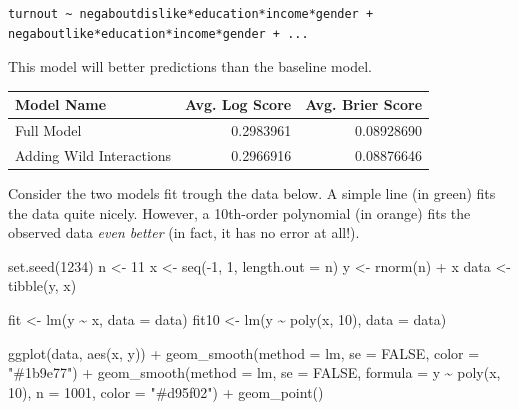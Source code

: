 \documentclass[
]{book}
\newenvironment{Shaded}{\begin{snugshade}}{\end{snugshade}}
\newcommand{\AttributeTok}[1]{\textcolor[rgb]{0.77,0.63,0.00}{#1}}
\newcommand{\ConstantTok}[1]{\textcolor[rgb]{0.00,0.00,0.00}{#1}}
\newcommand{\DecValTok}[1]{\textcolor[rgb]{0.00,0.00,0.81}{#1}}
\newcommand{\FunctionTok}[1]{\textcolor[rgb]{0.00,0.00,0.00}{#1}}
\newcommand{\NormalTok}[1]{#1}
\newcommand{\OtherTok}[1]{\textcolor[rgb]{0.56,0.35,0.01}{#1}}
\newcommand{\SpecialCharTok}[1]{\textcolor[rgb]{0.00,0.00,0.00}{#1}}
\newcommand{\StringTok}[1]{\textcolor[rgb]{0.31,0.60,0.02}{#1}}
\begin{document}
\begin{verbatim}
turnout ~ negaboutdislike*education*income*gender + negaboutlike*education*income*gender + ...
\end{verbatim}

This model will better predictions than the baseline model.

\begin{longtable}[]{@{}lrr@{}}
\toprule
Model Name & Avg. Log Score & Avg. Brier Score \\
\midrule
\endhead
Full Model & 0.2983961 & 0.08928690 \\
Adding Wild Interactions & 0.2966916 & 0.08876646 \\
\bottomrule
\end{longtable}

Consider the two models fit trough the data below. A simple line (in green) fits the data quite nicely. However, a 10th-order polynomial (in orange) fits the observed data \emph{even better} (in fact, it has no error at all!).

\begin{Shaded}
\begin{Highlighting}[]
\FunctionTok{set.seed}\NormalTok{(}\DecValTok{1234}\NormalTok{)}
\NormalTok{n }\OtherTok{\textless{}{-}} \DecValTok{11}
\NormalTok{x }\OtherTok{\textless{}{-}} \FunctionTok{seq}\NormalTok{(}\SpecialCharTok{{-}}\DecValTok{1}\NormalTok{, }\DecValTok{1}\NormalTok{, }\AttributeTok{length.out =}\NormalTok{ n)}
\NormalTok{y }\OtherTok{\textless{}{-}} \FunctionTok{rnorm}\NormalTok{(n) }\SpecialCharTok{+}\NormalTok{ x}
\NormalTok{data }\OtherTok{\textless{}{-}} \FunctionTok{tibble}\NormalTok{(y, x)}

\NormalTok{fit }\OtherTok{\textless{}{-}} \FunctionTok{lm}\NormalTok{(y }\SpecialCharTok{\textasciitilde{}}\NormalTok{ x, }\AttributeTok{data =}\NormalTok{ data)}
\NormalTok{fit10 }\OtherTok{\textless{}{-}} \FunctionTok{lm}\NormalTok{(y }\SpecialCharTok{\textasciitilde{}} \FunctionTok{poly}\NormalTok{(x, }\DecValTok{10}\NormalTok{), }\AttributeTok{data =}\NormalTok{ data)}

\FunctionTok{ggplot}\NormalTok{(data, }\FunctionTok{aes}\NormalTok{(x, y)) }\SpecialCharTok{+} 
  \FunctionTok{geom\_smooth}\NormalTok{(}\AttributeTok{method =}\NormalTok{ lm, }\AttributeTok{se =} \ConstantTok{FALSE}\NormalTok{, }\AttributeTok{color =} \StringTok{"\#1b9e77"}\NormalTok{) }\SpecialCharTok{+} 
  \FunctionTok{geom\_smooth}\NormalTok{(}\AttributeTok{method =}\NormalTok{ lm, }\AttributeTok{se =} \ConstantTok{FALSE}\NormalTok{, }\AttributeTok{formula =}\NormalTok{ y }\SpecialCharTok{\textasciitilde{}} \FunctionTok{poly}\NormalTok{(x, }\DecValTok{10}\NormalTok{), }\AttributeTok{n =} \DecValTok{1001}\NormalTok{, }\AttributeTok{color =} \StringTok{"\#d95f02"}\NormalTok{) }\SpecialCharTok{+} 
  \FunctionTok{geom\_point}\NormalTok{()}
\end{Highlighting}
\end{Shaded}
\end{document}
